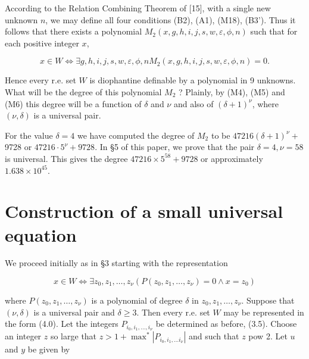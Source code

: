 \documentclass[11pt,a4paper]{article}
\newcommand{\origpage}[1]{\marginnote{\footnotesize\textbf{[#1]}}}
\begin{document}
According to the Relation Combining Theorem of [15], with a single new unknown $n$, we may define all four conditions (B2), (A1), (M18), (B3'). Thus it follows that there exists a polynomial $M_{2}(x,\allowbreak  g,\allowbreak  h,\allowbreak  i,\allowbreak  j,\allowbreak  s,\allowbreak  w,\allowbreak  \varepsilon,\allowbreak  \phi,\allowbreak  n)$ such that for each positive integer $x$,


\begin{equation*}
x \in W \Leftrightarrow \exists g, h, i, j, s, w, \varepsilon, \phi, n M_{2}(x, g, h, i, j, s, w, \varepsilon, \phi, n)=0 . \tag{3.14}
\end{equation*}


Hence every r.e. set $W$ is diophantine definable by a polynomial in 9 unknowns.\\
What will be the degree of this polynomial $M_{2}$ ? Plainly, by (M4), (M5) and (M6) this degree will be a function of $\delta$ and $\nu$ and also of $(\delta+1)^{\nu}$, where $(\nu,\allowbreak  \delta)$ is a universal pair.

For the value $\delta=4$ we have computed the degree of $M_{2}$ to be $47216(\delta+1)^{\nu}+$ 9728 or $47216 \cdot 5^{\nu}+9728$. In §5 of this paper, we prove that the pair $\delta=4,\allowbreak  \nu=58$ is universal. This gives the degree $47216 \times 5^{58}+9728$ or approximately $1.638\times10^{45}$.


\section{Construction of a small universal equation} \origpage{564}We proceed initially as in §3 starting with the representation


\begin{equation*}
x \in W \Leftrightarrow \exists z_{0}, z_{1}, \ldots, z_{\nu}\left(P\left(z_{0}, z_{1}, \ldots, z_{\nu}\right)=0 \wedge x=z_{0}\right) \tag{4.0}
\end{equation*}


where $P\left(z_{0},\allowbreak  z_{1},\allowbreak  \ldots,\allowbreak  z_{\nu}\right)$ is a polynomial of degree $\delta$ in $z_{0},\allowbreak  z_{1},\allowbreak  \ldots,\allowbreak  z_{\nu}$. Suppose that $(\nu,\allowbreak  \delta)$ is a universal pair and $\delta \geq 3$. Then every r.e. set $W$ may be represented in the form (4.0). Let the integers $P_{i_{0},i_{1},\ldots,i_{\nu}}$ be determined as before, (3.5). Choose an integer $z$ so large that $z>1+\max ^{*}\left|P_{i_{0}, i_{1}, \ldots i_{\nu}}\right|$ and such that $z$ pow 2. Let $u$ and $y$ be given by
\end{document}
